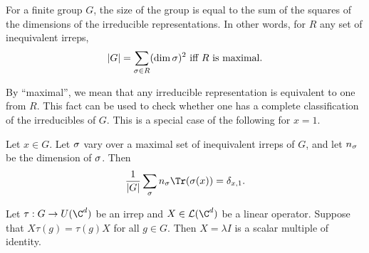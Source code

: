 \begin{fact}\label{fact:character-dimension}
	For a finite group $G$, the size of the group is equal to the sum of the squares of the dimensions of the irreducible representations. In other words, for $R$ any set of inequivalent irreps, 
	\begin{equation}\label{eq:character-dimension}
			\left\vert G\right\vert = \sum_{\sigma \in R} (\dim \sigma)^2 \text{ iff $R$ is maximal.}
		\end{equation}	
\end{fact}
By ``maximal'', we mean that any irreducible representation is equivalent to one from $R$. This fact can be used to check whether one has a complete classification of the irreducibles of $G$. This is a special case of the following for $x = 1$.
\begin{fact}\label{fact:orthogonality}
	Let $x\in G$. Let $\sigma$ vary over a maximal set of inequivalent irreps of $G$, and let $n_\sigma$ be the dimension of $\sigma$. Then
	\begin{equation}
		\frac 1{\abs G}\sum_\s n_\s\Tr(\s(x)) = \delta_{x,1}.
	\end{equation}
\end{fact}

\begin{fact}\label{fact:schur}
	Let $\tau: G\to U(\C^d)$ be an irrep and $X \in \m L(\C^d)$ be a linear operator. Suppose that $X\tau(g) = \tau(g)X$ for all $g\in G$. Then $X = \lambda I$ is a scalar multiple of identity. 
\end{fact}